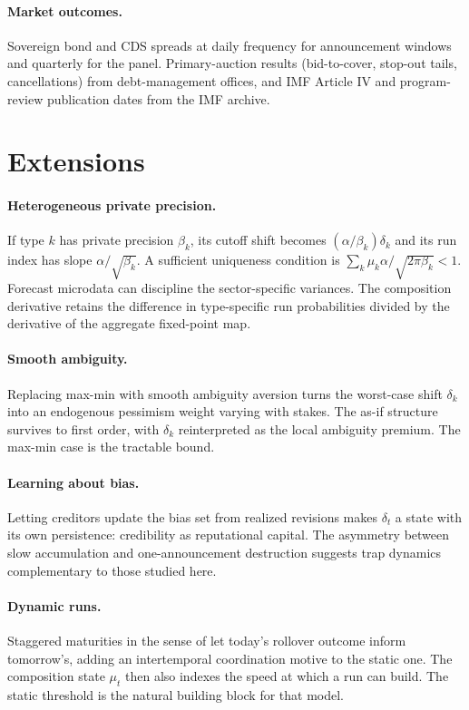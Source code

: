 \documentclass[11pt]{article}
\theoremstyle{definition}
\begin{document}
\paragraph{Market outcomes.} Sovereign bond and CDS spreads at daily frequency for announcement windows and quarterly for the panel. Primary-auction results (bid-to-cover, stop-out tails, cancellations) from debt-management offices, and IMF Article IV and program-review publication dates from the IMF archive.

\section{Extensions}\label{app:extensions}

\paragraph{Heterogeneous private precision.} If type $k$ has private precision $\beta_k$, its cutoff shift becomes $(\alpha/\beta_k)\delta_k$ and its run index has slope $\alpha/\sqrt{\beta_k}$. A sufficient uniqueness condition is $\sum_k\mu_k\alpha/\sqrt{2\pi\beta_k}<1$. Forecast microdata can discipline the sector-specific variances. The composition derivative retains the difference in type-specific run probabilities divided by the derivative of the aggregate fixed-point map.

\paragraph{Smooth ambiguity.} Replacing max-min with smooth ambiguity aversion turns the worst-case shift $\delta_k$ into an endogenous pessimism weight varying with stakes. The as-if structure survives to first order, with $\delta_k$ reinterpreted as the local ambiguity premium. The max-min case is the tractable bound.

\paragraph{Learning about bias.} Letting creditors update the bias set from realized revisions makes $\delta_t$ a state with its own persistence: credibility as reputational capital. The asymmetry between slow accumulation and one-announcement destruction suggests trap dynamics complementary to those studied here.

\paragraph{Dynamic runs.} Staggered maturities in the sense of \citet{HeXiong2012} let today's rollover outcome inform tomorrow's, adding an intertemporal coordination motive to the static one. The composition state $\mu_t$ then also indexes the speed at which a run can build. The static threshold is the natural building block for that model.

\clearpage
\printbibliography
\end{document}

